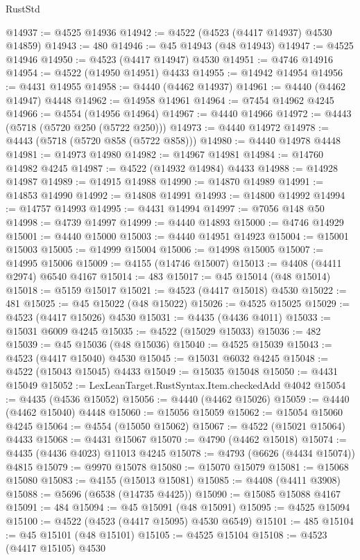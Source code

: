 \begin{lexlean}{RustStd}
\begin{coremodule}
{\begin{coremodule}
{{{{{{{{{{{{{{{{{{{{{{{{{{{{{{{{{{{{{{{{{{{{{{{{{{{{{{{{{{{{@14937 := @4525 @14936
@14942 := @4522 (@4523 (@4417 @14937) @4530 @14859)
@14943 := 480
@14946 := @45 @14943 (@48 @14943)
@14947 := @4525 @14946
@14950 := @4523 (@4417 @14947) @4530
@14951 := @4746 @14916
@14954 := @4522 (@14950 @14951) @4433
@14955 := @14942 @14954
@14956 := @4431 @14955
@14958 := @4440 (@4462 @14937)
@14961 := @4440 (@4462 @14947) @4448
@14962 := @14958 @14961
@14964 := @7454 @14962 @4245
@14966 := @4554 (@14956 @14964)
@14967 := @4440 @14966
@14972 := @4443 (@5718 (@5720 @250 (@5722 @250)))
@14973 := @4440 @14972
@14978 := @4443 (@5718 (@5720 @858 (@5722 @858)))
@14980 := @4440 @14978 @4448
@14981 := @14973 @14980
@14982 := @14967 @14981
@14984 := @14760 @14982 @4245
@14987 := @4522 (@14932 @14984) @4433
@14988 := @14928 @14987
@14989 := @14915 @14988
@14990 := @14870 @14989
@14991 := @14853 @14990
@14992 := @14808 @14991
@14993 := @14800 @14992
@14994 := @14757 @14993
@14995 := @4431 @14994
@14997 := @7056 @148 @50
@14998 := @4739 @14997
@14999 := @4440 @14893
@15000 := @4746 @14929
@15001 := @4440 @15000
@15003 := @4440 @14951 @14923
@15004 := @15001 @15003
@15005 := @14999 @15004
@15006 := @14998 @15005
@15007 := @14995 @15006
@15009 := @4155 (@14746 @15007)
@15013 := @4408 (@4411 @2974) @6540 @4167
@15014 := 483
@15017 := @45 @15014 (@48 @15014)
@15018 := @5159 @15017
@15021 := @4523 (@4417 @15018) @4530
@15022 := 481
@15025 := @45 @15022 (@48 @15022)
@15026 := @4525 @15025
@15029 := @4523 (@4417 @15026) @4530
@15031 := @4435 (@4436 @4011)
@15033 := @15031 @6009 @4245
@15035 := @4522 (@15029 @15033)
@15036 := 482
@15039 := @45 @15036 (@48 @15036)
@15040 := @4525 @15039
@15043 := @4523 (@4417 @15040) @4530
@15045 := @15031 @6032 @4245
@15048 := @4522 (@15043 @15045) @4433
@15049 := @15035 @15048
@15050 := @4431 @15049
@15052 := LexLeanTarget.RustSyntax.Item.checkedAdd @4042
@15054 := @4435 (@4536 @15052)
@15056 := @4440 (@4462 @15026)
@15059 := @4440 (@4462 @15040) @4448
@15060 := @15056 @15059
@15062 := @15054 @15060 @4245
@15064 := @4554 (@15050 @15062)
@15067 := @4522 (@15021 @15064) @4433
@15068 := @4431 @15067
@15070 := @4790 (@4462 @15018)
@15074 := @4435 (@4436 @4023) @11013 @4245
@15078 := @4793 (@6626 (@4434 @15074)) @4815
@15079 := @9970 @15078
@15080 := @15070 @15079
@15081 := @15068 @15080
@15083 := @4155 (@15013 @15081)
@15085 := @4408 (@4411 @3908)
@15088 := @5696 (@6538 (@14735 @4425))
@15090 := @15085 @15088 @4167
@15091 := 484
@15094 := @45 @15091 (@48 @15091)
@15095 := @4525 @15094
@15100 := @4522 (@4523 (@4417 @15095) @4530 @6549)
@15101 := 485
@15104 := @45 @15101 (@48 @15101)
@15105 := @4525 @15104
@15108 := @4523 (@4417 @15105) @4530
}}}}}}}}}}}}}}}}}}}}}}}}}}}}}}}}}}}}}}}}}}}}}}}}}}}}}}}}}}}}
\end{coremodule}}
\end{coremodule}
\end{lexlean}
